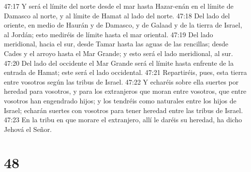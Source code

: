 47:17 Y será el límite del norte desde el mar hasta Hazar-enán en el límite de Damasco al norte, y al límite de Hamat al lado del norte.  
47:18 Del lado del oriente, en medio de Haurán y de Damasco, y de Galaad y de la tierra de Israel, al Jordán; esto mediréis de límite hasta el mar oriental.  
47:19 Del lado meridional, hacia el sur, desde Tamar hasta las aguas de las rencillas; desde Cades y el arroyo hasta el Mar Grande; y esto será el lado meridional, al sur.  
47:20 Del lado del occidente el Mar Grande será el límite hasta enfrente de la entrada de Hamat; este será el lado occidental.  
47:21 Repartiréis, pues, esta tierra entre vosotros según las tribus de Israel.  
47:22 Y echaréis sobre ella suertes por heredad para vosotros, y para los extranjeros que moran entre vosotros, que entre vosotros han engendrado hijos; y los tendréis como naturales entre los hijos de Israel; echarán suertes con vosotros para tener heredad entre las tribus de Israel.  
47:23 En la tribu en que morare el extranjero, allí le daréis su heredad, ha dicho Jehová el Señor.  

\chapter{48}

